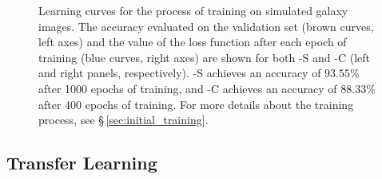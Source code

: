 \begin{figure}[htb]
	\begin{center}
  \end{center}
  \caption{Learning curves for the process of training \gamornet{} on simulated galaxy images. The accuracy evaluated on the validation set (brown curves, left axes) and the value of the loss function after each epoch of training (blue curves, right axes) are shown for both \gamornet{}-S and \gamornet{}-C (left and right panels, respectively). \gamornet{}-S achieves an accuracy of $93.55\%$ after 1000 epochs of training, and \gamornet{}-C achieves an accuracy of $88.33\%$ after 400 epochs of training. For more details about the training process, see \S\,\ref{sec:initial_training}.}
  \label{fig:base_network_train}
\end{figure}

\subsection{Transfer Learning} \label{sec:tf_intro}

